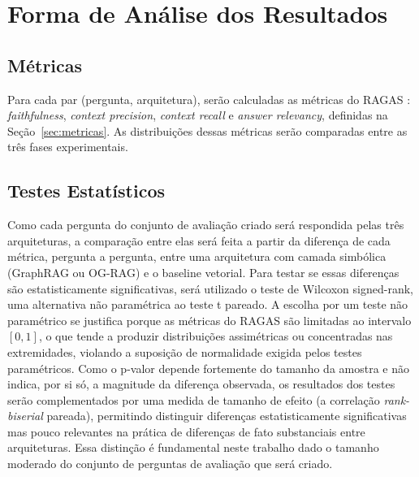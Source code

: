 \documentclass{article}
\begin{document}
	\newpage
	
	\section{Forma de Análise dos Resultados}
	
	\subsection{Métricas}
	
	Para cada par (pergunta, arquitetura), serão calculadas as métricas do RAGAS \cite{es-etal-2024-ragas}: \textit{faithfulness}, \textit{context precision}, \textit{context recall} e \textit{answer relevancy}, definidas na Seção~\ref{sec:metricas}. As distribuições dessas métricas serão comparadas entre as três fases experimentais. %
	
	\subsection{Testes Estatísticos}
	
	Como cada pergunta do conjunto de avaliação criado será respondida pelas três arquiteturas, a comparação entre elas será feita a partir da diferença de cada métrica, pergunta a pergunta, entre uma arquitetura com camada simbólica (GraphRAG ou OG-RAG) e o baseline vetorial. Para testar se essas diferenças são estatisticamente significativas, será utilizado o teste de Wilcoxon signed-rank, uma alternativa não paramétrica ao teste t pareado. A escolha por um teste não paramétrico se justifica porque as métricas do RAGAS são limitadas ao intervalo $[0,1]$, o que tende a produzir distribuições assimétricas ou concentradas nas extremidades, violando a suposição de normalidade exigida pelos testes paramétricos. Como o p-valor depende fortemente do tamanho da amostra e não indica, por si só, a magnitude da diferença observada, os resultados dos testes serão complementados por uma medida de tamanho de efeito (a correlação \textit{rank-biserial} pareada), permitindo distinguir diferenças estatisticamente significativas mas pouco relevantes na prática de diferenças de fato substanciais entre arquiteturas. Essa distinção é fundamental neste trabalho dado o tamanho moderado do conjunto de perguntas de avaliação que será criado.
	
\end{document}
